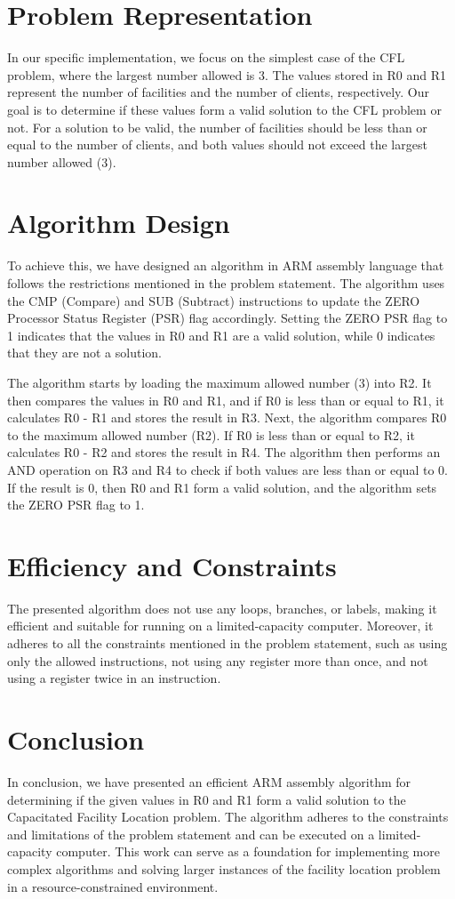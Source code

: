 \section{Problem Representation}
In our specific implementation, we focus on the simplest case of the CFL problem, where the largest number allowed is 3. The values stored in R0 and R1 represent the number of facilities and the number of clients, respectively. Our goal is to determine if these values form a valid solution to the CFL problem or not. For a solution to be valid, the number of facilities should be less than or equal to the number of clients, and both values should not exceed the largest number allowed (3).

\section{Algorithm Design}
To achieve this, we have designed an algorithm in ARM assembly language that follows the restrictions mentioned in the problem statement. The algorithm uses the CMP (Compare) and SUB (Subtract) instructions to update the ZERO Processor Status Register (PSR) flag accordingly. Setting the ZERO PSR flag to 1 indicates that the values in R0 and R1 are a valid solution, while 0 indicates that they are not a solution.

The algorithm starts by loading the maximum allowed number (3) into R2. It then compares the values in R0 and R1, and if R0 is less than or equal to R1, it calculates R0 - R1 and stores the result in R3. Next, the algorithm compares R0 to the maximum allowed number (R2). If R0 is less than or equal to R2, it calculates R0 - R2 and stores the result in R4. The algorithm then performs an AND operation on R3 and R4 to check if both values are less than or equal to 0. If the result is 0, then R0 and R1 form a valid solution, and the algorithm sets the ZERO PSR flag to 1.

\section{Efficiency and Constraints}
The presented algorithm does not use any loops, branches, or labels, making it efficient and suitable for running on a limited-capacity computer. Moreover, it adheres to all the constraints mentioned in the problem statement, such as using only the allowed instructions, not using any register more than once, and not using a register twice in an instruction.

\section{Conclusion}
In conclusion, we have presented an efficient ARM assembly algorithm for determining if the given values in R0 and R1 form a valid solution to the Capacitated Facility Location problem. The algorithm adheres to the constraints and limitations of the problem statement and can be executed on a limited-capacity computer. This work can serve as a foundation for implementing more complex algorithms and solving larger instances of the facility location problem in a resource-constrained environment.



